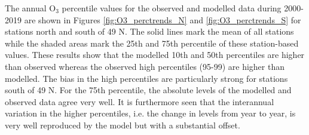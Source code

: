 The annual O$_3$ percentile values for the observed and modelled data during 2000-2019 are shown in Figures \ref{fig:O3_perctrends_N} and \ref{fig:O3_perctrends_S} for stations north and south of 49 \degrees N. The solid lines mark the mean of all stations while the shaded areas mark the 25th and 75th percentile of these station-based values. These results show that the modelled 10th and 50th percentiles are higher than observed whereas the observed high percentiles (95-99) are higher than modelled. The bias in the high percentiles are particularly strong for stations south of 49 \degrees N. For the 75th percentile, the absolute levels of the modelled and observed data agree very well. It is furthermore seen that the interannual variation in the higher percentiles, i.e. the change in levels from year to year, is very well reproduced by the model but with a substantial offset. 

